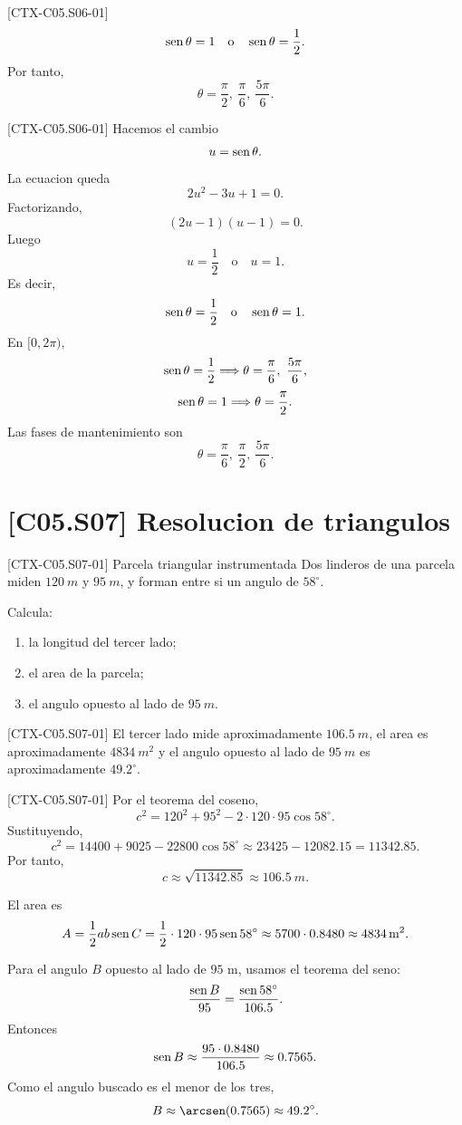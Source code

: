 \begin{shortanswer}{[CTX-C05.S06-01]}
\[
\operatorname{sen}\theta=1\quad \text{o}\quad \operatorname{sen}\theta=\frac12.
\]
Por tanto,
\[
\theta=\frac{\pi}{2},\ \frac{\pi}{6},\ \frac{5\pi}{6}.
\]
\end{shortanswer}

\begin{fullsolution}{[CTX-C05.S06-01]}
Hacemos el cambio
\[
u=\operatorname{sen}\theta.
\]
La ecuacion queda
\[
2u^2-3u+1=0.
\]
Factorizando,
\[
(2u-1)(u-1)=0.
\]
Luego
\[
u=\frac12 \quad \text{o}\quad u=1.
\]
Es decir,
\[
\operatorname{sen}\theta=\frac12 \quad \text{o}\quad \operatorname{sen}\theta=1.
\]
En \([0,2\pi)\),
\[
\operatorname{sen}\theta=\frac12 \Longrightarrow \theta=\frac{\pi}{6},\ \frac{5\pi}{6},
\]
\[
\operatorname{sen}\theta=1 \Longrightarrow \theta=\frac{\pi}{2}.
\]
Las fases de mantenimiento son
\[
\theta=\frac{\pi}{6},\ \frac{\pi}{2},\ \frac{5\pi}{6}.
\]
\end{fullsolution}

\section{[C05.S07] Resolucion de triangulos}

\begin{exercise}{[CTX-C05.S07-01] Parcela triangular instrumentada}
Dos linderos de una parcela miden \(\SI{120}{m}\) y \(\SI{95}{m}\), y forman entre si un
angulo de \(58^\circ\).

Calcula:
\begin{enumerate}
  \item la longitud del tercer lado;
  \item el area de la parcela;
  \item el angulo opuesto al lado de \(\SI{95}{m}\).
\end{enumerate}
\end{exercise}

\begin{shortanswer}{[CTX-C05.S07-01]}
El tercer lado mide aproximadamente \(\SI{106.5}{m}\), el area es aproximadamente
\(\SI{4834}{m^2}\) y el angulo opuesto al lado de \(\SI{95}{m}\) es aproximadamente
\(49.2^\circ\).
\end{shortanswer}

\begin{fullsolution}{[CTX-C05.S07-01]}
Por el teorema del coseno,
\[
c^2=120^2+95^2-2\cdot 120\cdot 95\cos 58^\circ.
\]
Sustituyendo,
\[
c^2=14400+9025-22800\cos 58^\circ\approx 23425-12082.15=11342.85.
\]
Por tanto,
\[
c\approx \sqrt{11342.85}\approx \SI{106.5}{m}.
\]

El area es
\[
A=\frac12 ab\operatorname{sen} C=\frac12\cdot 120\cdot 95\operatorname{sen} 58^\circ
\approx 5700\cdot 0.8480\approx \SI{4834}{m^2}.
\]

Para el angulo \(B\) opuesto al lado de \(95\) m, usamos el teorema del seno:
\[
\frac{\operatorname{sen} B}{95}=\frac{\operatorname{sen} 58^\circ}{106.5}.
\]
Entonces
\[
\operatorname{sen} B\approx \frac{95\cdot 0.8480}{106.5}\approx 0.7565.
\]
Como el angulo buscado es el menor de los tres,
\[
B\approx \arcsen(0.7565)\approx 49.2^\circ.
\]
\end{fullsolution}

